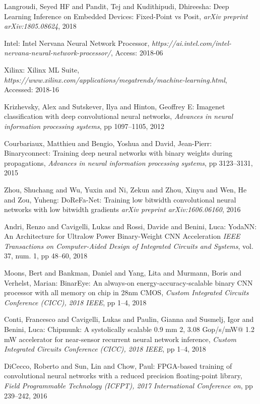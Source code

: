 \documentclass[techrep,english]{ipsj} %
\begin{document}
\begin{thebibliography}{99}
  Langroudi, Seyed HF and Pandit, Tej and Kudithipudi, Dhireesha:
  Deep Learning Inference on Embedded Devices: Fixed-Point vs Posit,
  {\it arXiv preprint arXiv:1805.08624},
  2018

  Intel:
  Intel Nervana Neural Network Processor,
  {\it https://ai.intel.com/intel-nervana-neural-network-processor/},
  Access: 2018-06

  Xilinx:
  Xilinx ML Suite,
  {\it https://www.xilinx.com/applications/megatrends/machine-learning.html},
  Accessed: 2018-16

  Krizhevsky, Alex and Sutskever, Ilya and Hinton, Geoffrey E:
  Imagenet classification with deep convolutional neural networks,
  {\it Advances in neural information processing systems},
  pp 1097–1105, 2012

  Courbariaux, Matthieu and Bengio, Yoshua and David, Jean-Pierr:
  Binaryconnect: Training deep neural networks with binary weights during propagations,
  {\it Advances in neural information processing systems},
  pp 3123–3131, 2015

  Zhou, Shuchang and Wu, Yuxin and Ni, Zekun and Zhou, Xinyu and Wen, He and Zou, Yuheng:
  DoReFa-Net: Training low bitwidth convolutional neural networks with low bitwidth gradients
  {\it  arXiv preprint arXiv:1606.06160},
  2016

  Andri, Renzo and Cavigelli, Lukas and Rossi, Davide and Benini, Luca:
  YodaNN: An Architecture for Ultralow Power Binary-Weight CNN Acceleration
  {\it IEEE Transactions on Computer-Aided Design of Integrated Circuits and Systems},
  vol.
37, num.
1, pp 48–60, 2018

  Moons, Bert and Bankman, Daniel and Yang, Lita and Murmann, Boris and Verhelst, Marian:
  BinarEye: An always-on energy-accuracy-scalable binary CNN processor with all memory on chip in 28nm CMOS,
  {\it Custom Integrated Circuits Conference (CICC), 2018 IEEE},
  pp 1–4, 2018


  Conti, Francesco and Cavigelli, Lukas and Paulin, Gianna and Susmelj, Igor and Benini, Luca:
  Chipmunk: A systolically scalable 0.9 mm 2, 3.08 Gop/s/mW@ 1.2 mW accelerator for near-sensor recurrent neural network inference,
  {\it Custom Integrated Circuits Conference (CICC), 2018 IEEE},
  pp 1–4, 2018

  DiCecco, Roberto and Sun, Lin and Chow, Paul:
  FPGA-based training of convolutional neural networks with a reduced precision floating-point library,
  {\it  Field Programmable Technology (ICFPT), 2017 International Conference on},
  pp 239–242, 2016


\end{thebibliography}
\end{document}
